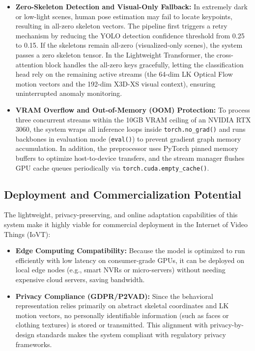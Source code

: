 \documentclass[12pt]{article}
\begin{document}
\begin{itemize}
    \begin{verbatim}
    gy = int(np.clip(mid[1] / H * 2, 0, 1))
    gx = int(np.clip(mid[0] / W * 4, 0, 3))
    \end{verbatim}
    This prevents index-out-of-range errors when tracked flow coordinates occasionally drift outside the physical pixel boundaries of the frame.
    \item \textbf{Zero-Skeleton Detection and Visual-Only Fallback:} In extremely dark or low-light scenes, human pose estimation may fail to locate keypoints, resulting in all-zero skeleton vectors. The pipeline first triggers a retry mechanism by reducing the YOLO detection confidence threshold from 0.25 to 0.15. If the skeletons remain all-zero (visualized-only scenes), the system passes a zero skeleton tensor. In the Lightweight Transformer, the cross-attention block handles the all-zero keys gracefully, letting the classification head rely on the remaining active streams (the 64-dim LK Optical Flow motion vectors and the 192-dim X3D-XS visual context), ensuring uninterrupted anomaly monitoring.
    \item \textbf{VRAM Overflow and Out-of-Memory (OOM) Protection:} To process three concurrent streams within the 10GB VRAM ceiling of an NVIDIA RTX 3060, the system wraps all inference loops inside \texttt{torch.no\_grad()} and runs backbones in evaluation mode (\texttt{eval()}) to prevent gradient graph memory accumulation. In addition, the preprocessor uses PyTorch pinned memory buffers to optimize host-to-device transfers, and the stream manager flushes GPU cache queues periodically via \texttt{torch.cuda.empty\_cache()}.
\end{itemize}

\clearpage
\subsection{Deployment and Commercialization Potential}
The lightweight, privacy-preserving, and online adaptation capabilities of this system make it highly viable for commercial deployment in the Internet of Video Things (IoVT):
\begin{itemize}
    \item \textbf{Edge Computing Compatibility:} Because the model is optimized to run efficiently with low latency on consumer-grade GPUs, it can be deployed on local edge nodes (e.g., smart NVRs or micro-servers) without needing expensive cloud servers, saving bandwidth.
    \item \textbf{Privacy Compliance (GDPR/P2VAD):} Since the behavioral representation relies primarily on abstract skeletal coordinates and LK motion vectors, no personally identifiable information (such as faces or clothing textures) is stored or transmitted. This alignment with privacy-by-design standards makes the system compliant with regulatory privacy frameworks.
\end{itemize}
\end{document}
